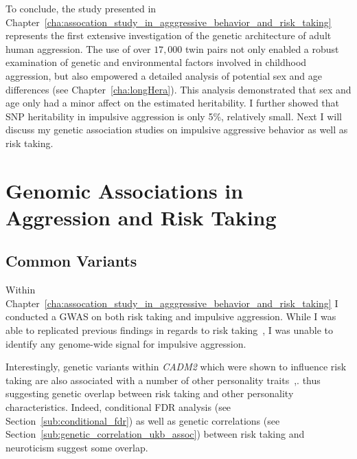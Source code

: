 To conclude, the study presented in Chapter~\ref{cha:assocation_study_in_agggressive_behavior_and_risk_taking} represents the first extensive investigation of the genetic architecture of adult human aggression.
The use of over $17,000$ twin pairs not only enabled a robust examination of genetic and environmental factors involved in childhood aggression, but also empowered a detailed analysis of potential sex and age differences (see Chapter~\ref{cha:longHera}).
This analysis demonstrated that sex and age only had a minor affect on the estimated heritability.
I further showed that SNP heritability in impulsive aggression is  only 5\%, relatively small.
Next I will discuss my genetic association studies on impulsive aggressive behavior as well as risk taking. 

\section{Genomic Associations in Aggression and Risk Taking}
\label{sec:genomic_associations_in_aggression_and_risk_taking}

\subsection{Common Variants}
\label{sub:common_variants_discussion}

Within Chapter~\ref{cha:assocation_study_in_agggressive_behavior_and_risk_taking} I conducted a GWAS on both risk taking and impulsive aggression.
While I was able to replicated previous findings in regards to risk taking~\cite{Day2016}, I was unable to identify any genome-wide signal for impulsive aggression.

Interestingly, genetic variants within \textit{CADM2} which were shown to influence risk taking are also associated with a number of other personality traits~\cite{Boutwell2017},.
thus suggesting genetic overlap between risk taking and other personality characteristics.
Indeed, conditional FDR analysis (see Section~\ref{sub:conditional_fdr}) as well as genetic correlations (see Section~\ref{sub:genetic_correlation_ukb_assoc}) between risk taking and neuroticism suggest some overlap.

